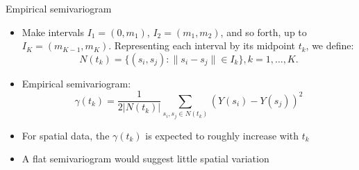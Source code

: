 \begin{frame}{Empirical semivariogram}
	\begin{itemize}
		\item {} Make intervals $I_1=(0,m_1)$,
		$I_2=(m_1,m_2)$, and so forth, up to $I_K=(m_{K-1},m_K)$.
		Representing each interval by its midpoint $t_k$, we
		define:
		\[
		N(t_k) = \{(s_i,s_j): \|s_i - s_j\| \in I_k \},
		k=1,\ldots,K.
		\]
		\item \alert{Empirical semivariogram:}
		\[
		\gamma(t_k) = \frac{1}{2|N(t_k)|}\sum_{s_i,s_j \in
			N(t_k)}(Y(s_i)-Y(s_j))^2
		\]
		\item For spatial data, the $\gamma(t_k)$ is expected to roughly increase with $t_k$
		\item A flat semivariogram would suggest little spatial variation
	\end{itemize}
\end{frame}

